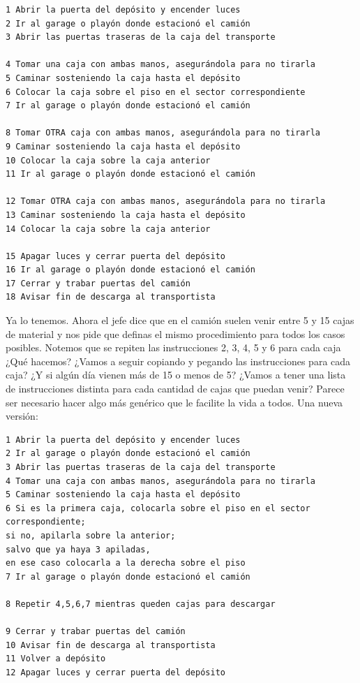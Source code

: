 \documentclass[
  letterpaper,
  DIV=11,
  numbers=noendperiod]{scrreprt}
\begin{document}
\begin{verbatim}
1 Abrir la puerta del depósito y encender luces 
2 Ir al garage o playón donde estacionó el camión 
3 Abrir las puertas traseras de la caja del transporte

4 Tomar una caja con ambas manos, asegurándola para no tirarla 
5 Caminar sosteniendo la caja hasta el depósito 
6 Colocar la caja sobre el piso en el sector correspondiente 
7 Ir al garage o playón donde estacionó el camión

8 Tomar OTRA caja con ambas manos, asegurándola para no tirarla 
9 Caminar sosteniendo la caja hasta el depósito 
10 Colocar la caja sobre la caja anterior 
11 Ir al garage o playón donde estacionó el camión

12 Tomar OTRA caja con ambas manos, asegurándola para no tirarla 
13 Caminar sosteniendo la caja hasta el depósito 
14 Colocar la caja sobre la caja anterior

15 Apagar luces y cerrar puerta del depósito 
16 Ir al garage o playón donde estacionó el camión 
17 Cerrar y trabar puertas del camión 
18 Avisar fin de descarga al transportista
\end{verbatim}

Ya lo tenemos. Ahora el jefe dice que en el camión suelen venir entre 5
y 15 cajas de material y nos pide que definas el mismo procedimiento
para todos los casos posibles. Notemos que se repiten las instrucciones
2, 3, 4, 5 y 6 para cada caja ¿Qué hacemos? ¿Vamos a seguir copiando y
pegando las instrucciones para cada caja? ¿Y si algún día vienen más de
15 o menos de 5? ¿Vamos a tener una lista de instrucciones distinta para
cada cantidad de cajas que puedan venir? Parece ser necesario hacer algo
más genérico que le facilite la vida a todos. Una nueva versión:

\begin{verbatim}
1 Abrir la puerta del depósito y encender luces 
2 Ir al garage o playón donde estacionó el camión 
3 Abrir las puertas traseras de la caja del transporte 
4 Tomar una caja con ambas manos, asegurándola para no tirarla 
5 Caminar sosteniendo la caja hasta el depósito 
6 Si es la primera caja, colocarla sobre el piso en el sector correspondiente;
si no, apilarla sobre la anterior;
salvo que ya haya 3 apiladas,
en ese caso colocarla a la derecha sobre el piso 
7 Ir al garage o playón donde estacionó el camión 

8 Repetir 4,5,6,7 mientras queden cajas para descargar 

9 Cerrar y trabar puertas del camión 
10 Avisar fin de descarga al transportista 
11 Volver a depósito 
12 Apagar luces y cerrar puerta del depósito
\end{verbatim}
\end{document}
